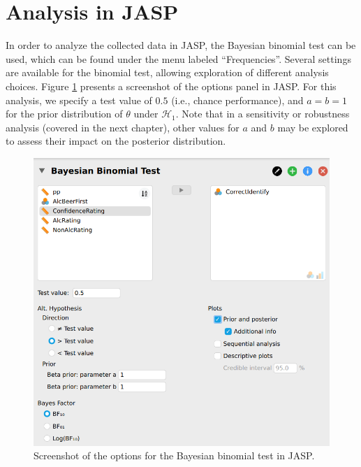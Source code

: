 \documentclass[
]{book}
\begin{document}
\hypertarget{analysis-in-jasp}{%
\section{Analysis in JASP}\label{analysis-in-jasp}}

In order to analyze the collected data in JASP, the Bayesian binomial test can be used, which can be found under the menu labeled ``Frequencies''. Several settings are available for the binomial test, allowing exploration of different analysis choices. Figure \ref{fig:jasp-screenshot-binomial-test} presents a screenshot of the options panel in JASP. For this analysis, we specify a test value of \(0.5\) (i.e., chance performance), and \(a = b = 1\) for the prior distribution of \(\theta\) under \(\mathcal{H}_1\). Note that in a sensitivity or robustness analysis (covered in the next chapter), other values for \(a\) and \(b\) may be explored to assess their impact on the posterior distribution.

\begin{figure}

{\centering \includegraphics[width=1\linewidth]{Figures/binomTestJASPpanel2022} 

}

\caption{Screenshot of the options for the Bayesian binomial test in JASP.}\label{fig:jasp-screenshot-binomial-test}
\end{figure}
\end{document}
